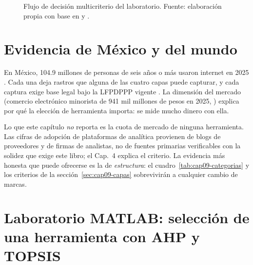 \begin{figure}[!htb]
  \centering
  \resizebox{0.9\textwidth}{!}{}
  \caption{Flujo de decisión multicriterio del laboratorio. Fuente:
  elaboración propia con base en \textcite{saaty1977} y \textcite{hwang1981}.}
  \label{fig:cap09-flujo}
\end{figure}

\section{Evidencia de México y del mundo}

En México, 104.9 millones de personas de seis años o más usaron internet en
2025 \parencite{inegi2026endutih}. Cada una deja rastros que alguna de las
cuatro capas puede capturar, y cada captura exige base legal bajo la
LFPDPPP vigente \parencite{dof_lfpdppp2025}. La dimensión del mercado
(comercio electrónico minorista de 941 mil millones de pesos en 2025,
\textcite{amvo2026}) explica por qué la elección de herramienta importa: se
mide mucho dinero con ella.

Lo que este capítulo \emph{no} reporta es la cuota de mercado de ninguna
herramienta. Las cifras de adopción de plataformas de analítica provienen de
blogs de proveedores y de firmas de analistas, no de fuentes primarias
verificables con la solidez que exige este libro; el Cap.~4 explica el
criterio. La evidencia más honesta que puede ofrecerse es la de
\emph{estructura}: el cuadro~\ref{tab:cap09-categorias} y los criterios de la
sección~\ref{sec:cap09-capas} sobrevivirán a cualquier cambio de marcas.

\section{Laboratorio MATLAB: selección de una herramienta con AHP y TOPSIS}
\label{sec:cap09-lab}

